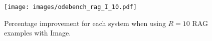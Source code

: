 \documentclass{article}
\begin{document}
\begin{figure}[H]
    \centering
    \texttt{[image: images/odebench\_rag\_I\_10.pdf]}
    \caption{Percentage improvement for each system when using $R=10$ RAG examples with Image.}
    \label{fig:odebench_rag-i-10}
\end{figure}


\end{document}
